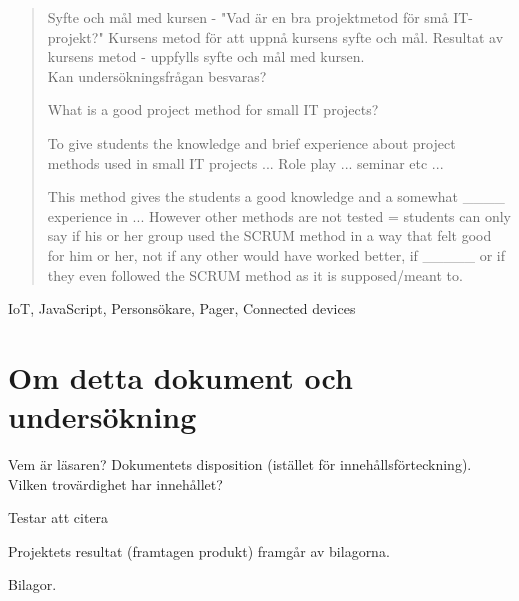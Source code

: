 
\begin{abstract}
Syfte och mål med kursen - "Vad är en bra projektmetod för små IT-projekt?" Kursens metod för att uppnå
kursens syfte och mål. Resultat av kursens metod - uppfylls syfte och mål med kursen.\\
Kan undersökningsfrågan besvaras?

What is a good project method for small IT projects? 

To give students the knowledge and brief experience about project methods used in small IT projects ... Role play ... seminar etc ...

This method gives the students a good knowledge and a somewhat ____ experience in ... However other methods are not tested = students can only say if his or her group used the SCRUM method in a way that felt good for him or her, not if any other would have worked better, if _____ or if they even followed the SCRUM method as it is supposed/meant to. 


\end{abstract}

\begin{IEEEkeywords}
IoT, JavaScript, Personsökare, Pager, Connected devices
\end{IEEEkeywords}

\section{Om detta dokument och undersökning}
Vem är läsaren? Dokumentets disposition (istället för innehållsförteckning). Vilken trovärdighet har innehållet?

Testar att citera \cite{eklund_arbeta_2010}

Projektets resultat (framtagen produkt) framgår av bilagorna.

Bilagor.
